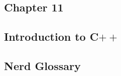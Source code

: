 \begin{itemize}
    \pybullet 
\end{itemize}

\subsection*{Chapter 11}

\begin{itemize}
    \pybullet 
\end{itemize}

\subsection*{Introduction to C$++$}

\begin{itemize}
    \pybullet {}
\end{itemize}

\subsection*{Nerd Glossary}

\begin{itemize}
    \pybullet 
\end{itemize}


